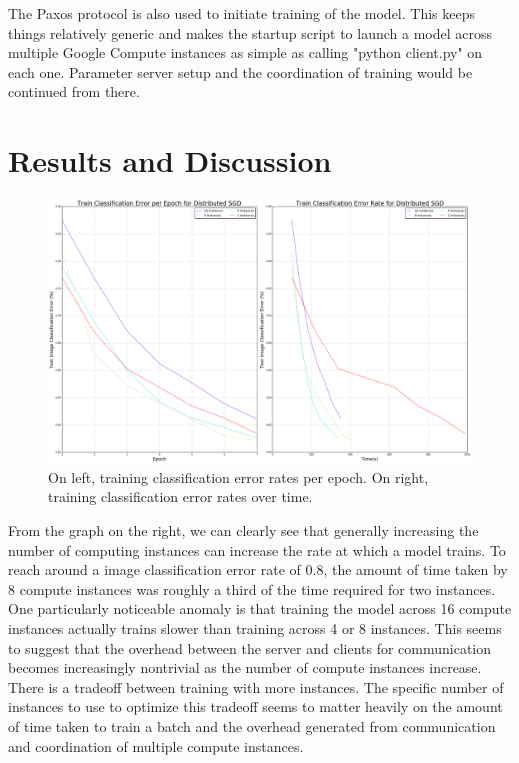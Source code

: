 \documentclass[11pt]{article}
\begin{document}
\noindent The Paxos protocol is also used to initiate training of the model. This keeps things relatively generic and makes the startup script to launch a model across multiple Google Compute instances as simple as calling "python client.py" on each one. Parameter server setup and the coordination of training would be continued from there.

\section{Results and Discussion}


\begin{figure}[!htp]
  \centering
      \includegraphics[scale = .2]{./images/sgd_results.png}
  \caption{On left, training classification error rates per epoch. On right, training classification error rates over time.}
  \label{fig:local}
\end{figure}

\noindent From the graph on the right, we can clearly see that generally increasing the number of computing instances can increase the rate at which a model trains. To reach around a image classification error rate of 0.8, the amount of time taken by 8 compute instances was roughly a third of the time required for two instances. One particularly noticeable anomaly is that training the model across 16 compute instances actually trains slower than training across 4 or 8 instances. This seems to suggest that the overhead between the server and clients for communication becomes increasingly nontrivial as the number of compute instances increase. There is a tradeoff between training with more instances. The specific number of instances to use to optimize this tradeoff seems to matter heavily on the amount of time taken to train a batch and the overhead generated from communication and coordination of multiple compute instances.\\
\end{document}
